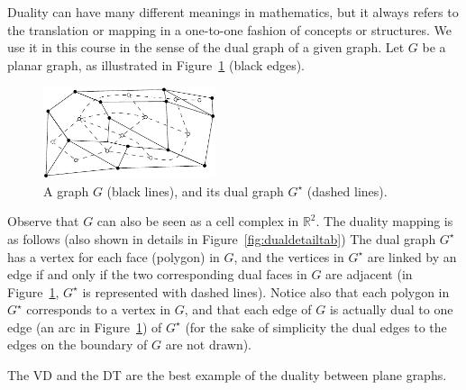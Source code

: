 Duality can have many different meanings in mathematics, but it always refers to the translation or mapping in a one-to-one fashion of concepts or structures. 
We use it in this course in the sense of the dual graph of a given graph. 
Let $G$ be a planar graph, as illustrated in Figure~\ref{fig:dual_graph} (black edges).
\begin{figure}
  \centering
  \includegraphics[width=0.45\textwidth]{figs/dual_graph}
  \caption{A graph $G$ (black lines), and its dual graph $G^\star$ (dashed lines).}
\label{fig:dual_graph}
\end{figure}
Observe that $G$ can also be seen as a cell complex in $\mathbb{R}^{2}$. 
The duality mapping is as follows (also shown in details in Figure~\ref{fig:dualdetailtab})
The dual graph $G^{\star}$ has a vertex for each face (polygon) in $G$, and the vertices in $G^{\star}$ are linked by an edge if and only if the two corresponding dual faces in $G$ are adjacent (in Figure~\ref{fig:dual_graph}, $G^{\star}$ is represented with dashed lines). 
Notice also that each polygon in $G^{\star}$ corresponds to a vertex in $G$, and that each edge of $G$ is actually dual to one edge (an arc in Figure~\ref{fig:dual_graph}) of $G^{\star}$ (for the sake of simplicity the dual edges to the edges on the boundary of $G$ are not drawn).

The VD and the DT are the best example of the duality between plane graphs.

